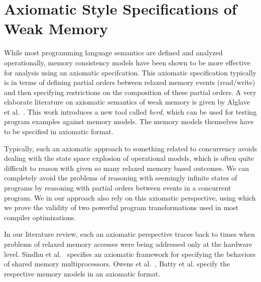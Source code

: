 \section{Axiomatic Style Specifications of Weak Memory}

While most programming language semantics are defined and analyzed operationally, memory consistency models have been shown to be more effective for analysis using an axiomatic specifcation.
This axiomatic specification typically is in terms of defining partial orders between relaxed memory events (read/write) and then specifying restrictions on the composition of these partial orders. 
A very elaborate literature on axiomatic semantics of weak memory is given by Alglave et al.~\cite{Alglave}. 
This work introduces a new tool called \textit{herd}, which can be used for testing program examples against memory models. The memory models themselves have to be specified in axiomatic format. 

Typically, such an axiomatic approach to something related to concurrency avoids dealing with the state space explosion of operational models, which is often quite difficult to reason with given so many relaxed memory based outcomes. 
We can completely avoid the problems of reasoning with seemingly infinite states of programs by reasoning with partial orders between events in a concurrent program.
We in our approach also rely on this axiomatic perspective, using which we prove the validity of two powerful program transformations used in most compiler optimizations. 

In our literature review, such an axiomatic perspective traces back to times when problems of relaxed memory accesses were being addressed only at the hardware level. 
Sindhu et al.~\cite{Sindhu} specifies an axiomatic framework for specifying the behaviors of shared memory multiprocessors. 
Owens et al.~\cite{OwensS}, Batty et al.\cite{BattyM} specify the respective memory models in an axiomatic format. 



